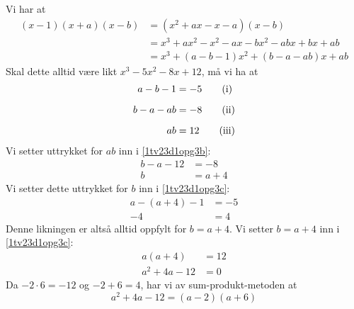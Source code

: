 Vi har at
\begin{align*}
	(x - 1)(x +a)(x - b) &= (x^2+a x-x-a)(x-b) \\
	&= x^3+ax^2-x^2-ax-bx^2-abx+bx+ab \\
	&= x^3+(a-b-1)x^2+(b-a-ab)x+ab
\end{align*}
Skal dette alltid være likt $x^3-5x^2-8x + 12$, må vi ha at
\begin{align*}
	a-b-1&=-5  \tag{i}\label{1tv23d1opg3a} \vn
	b-a-ab &= -8 \tag{ii}\label{1tv23d1opg3b} \vn
	a b &= 12 \tag{iii}\label{1tv23d1opg3c}
\end{align*}
Vi setter uttrykket for $ab$ inn i \eqref{1tv23d1opg3b}:
\begin{align*}
	b-a-12 &= -8 \\
	b &= a+4
\end{align*}
Vi setter dette uttrykket for $b$ inn i \eqref{1tv23d1opg3c}:
\begin{align*}
	a-(a+4)-1 &= -5 \\
	-4 &= 4
\end{align*}
Denne likningen er altså alltid oppfylt for $b=a+4$. Vi setter $b=a+4$ inn i \eqref{1tv23d1opg3c}:
\begin{align*}
	a(a+4)&=12 \\
	a^2+4a-12 &= 0
\end{align*}
Da $-2\cdot6=-12$ og $-2+6=4$, har vi av sum-produkt-metoden at
\[ a^2+4a-12=(a-2)(a+6) \]

